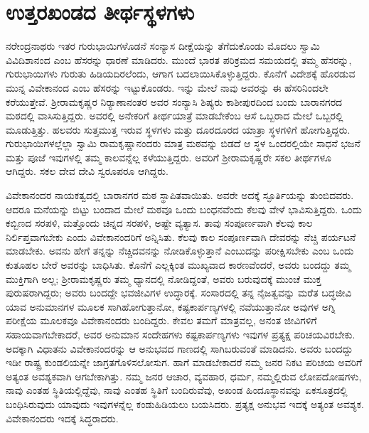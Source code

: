 
\chapter{ಉತ್ತರಖಂಡದ ತೀರ್ಥಸ್ಥಳಗಳು}

ನರೇಂದ್ರನಾಥರು ಇತರ ಗುರುಭಾಯಿಗಳೊಡನೆ ಸಂನ್ಯಾಸ ದೀಕ್ಷೆಯನ್ನು ತೆಗೆದುಕೊಂಡು ಮೊದಲು ಸ್ವಾಮಿ ವಿವಿದಿಶಾನಂದ ಎಂಬ ಹೆಸರನ್ನು ಧಾರಣೆ ಮಾಡಿದರು. ಮುಂದೆ ಭಾರತ ಪರಿಕ್ರಮದ ಸಮಯದಲ್ಲಿ ತಮ್ಮ ಹೆಸರನ್ನು, ಗುರುಭಾಯಿಗಳು ಗುರುತು ಹಿಡಿಯದಿರಲೆಂದು, ಆಗಾಗ ಬದಲಾಯಿಸಿಕೊಳ್ಳುತ್ತಿದ್ದರು. ಕೊನೆಗೆ ವಿದೇಶಕ್ಕೆ ಹೊರಡುವ ಮುನ್ನ ವಿವೇಕಾನಂದ ಎಂಬ ಹೆಸರನ್ನು ಇಟ್ಟುಕೊಂಡರು. ಇನ್ನು ಮೇಲೆ ನಾವು ಅವರನ್ನು ಈ ಹೆಸರಿನಿಂದಲೇ ಕರೆಯುತ್ತೇವೆ. ಶ‍್ರೀರಾಮಕೃಷ್ಣರ ನಿರ‍್ಯಾಣಾನಂತರ ಅವರ ಸಂನ್ಯಾಸಿ ಶಿಷ್ಯರು ಕಾಶೀಪುರದಿಂದ ಬಂದು ಬಾರಾನಗರದ ಮಠದಲ್ಲಿ ವಾಸಿಸುತ್ತಿದ್ದರು. ಅವರಲ್ಲಿ ಅನೇಕರಿಗೆ ತೀರ್ಥಯಾತ್ರೆ ಮಾಡಬೇಕೆಂಬ ಆಸೆ ಒಬ್ಬರಾದ ಮೇಲೆ ಒಬ್ಬರಲ್ಲಿ ಮೂಡುತ್ತಿತ್ತು. ಹಲವರು ಸುತ್ತಮುತ್ತ ಇರುವ ಸ್ಥಳಗಳು ಮತ್ತು ದೂರದೂರದ ಯಾತ್ರಾ ಸ್ಥಳಗಳಿಗೆ ಹೋಗುತ್ತಿದ್ದರು. ಗುರುಭಾಯಿಗಳಲ್ಲೆಲ್ಲಾ ಸ್ವಾಮಿ ರಾಮಕೃಷ್ಣಾನಂದರು ಮಾತ್ರ ಮಠವನ್ನು ಬಿಡದೆ ಆ ಸ್ಥಳ ಒಂದರಲ್ಲಿಯೇ ಸಾಧನೆ ಭಜನೆ ಮತ್ತು ಪೂಜೆ ಇವುಗಳಲ್ಲಿ ತಮ್ಮ ಕಾಲವನ್ನೆಲ್ಲ ಕಳೆಯುತ್ತಿದ್ದರು. ಅವರಿಗೆ ಶ‍್ರೀರಾಮಕೃಷ್ಣರೇ ಸಕಲ ತೀರ್ಥಗಳೂ ಆಗಿದ್ದರು. ಸಕಲ ದೇವ ದೇವಿ ಸ್ವರೂಪರೂ ಆಗಿದ್ದರು.

ವಿವೇಕಾನಂದರ ನಾಯಕತ್ವದಲ್ಲಿ ಬಾರಾನಗರ ಮಠ ಸ್ಥಾಪಿತವಾಯಿತು. ಅವರೇ ಅದಕ್ಕೆ ಸ್ಫೂರ್ತಿಯನ್ನು ತುಂಬಿದವರು. ಆದರೂ ಮನೆಯನ್ನು ಬಿಟ್ಟು ಬಂದಾದ ಮೇಲೆ ಮಠವೂ ಒಂದು ಬಂಧನವೆಂದು ಕೆಲವು ವೇಳೆ ಭಾವಿಸುತ್ತಿದ್ದರು. ಒಂದು ಕಬ್ಬಿಣದ ಸರಪಳಿ, ಮತ್ತೊಂದು ಚಿನ್ನದ ಸರಪಳಿ, ಅಷ್ಟೇ ವ್ಯತ್ಯಾಸ. ತಾವು ಸಂಪೂರ್ಣವಾಗಿ ಕೆಲವು ಕಾಲ ನಿರ್ಲಿಪ್ತವಾಗಬೇಕು ಎಂದು ವಿವೇಕಾನಂದರಿಗೆ ಅನ್ನಿಸಿತು. ಕೆಲವು ಕಾಲ ಸಂಪೂರ್ಣವಾಗಿ ದೇವರನ್ನು ನೆಚ್ಚಿ ಪರ್ಯಟನೆ ಮಾಡಬೇಕು. ಅವನು ಹೇಗೆ ತನ್ನನ್ನು ನೆಚ್ಚಿದವನನ್ನು ನೋಡಿಕೊಳ್ಳುತ್ತಾನೆ ಎಂಬುದನ್ನು ಪರೀಕ್ಷಿಸಬೇಕು ಎಂಬ ಒಂದು ಕುತೂಹಲ ಬೇರೆ ಅವರನ್ನು ಬಾಧಿಸಿತು. ಕೊನೆಗೆ ಎಲ್ಲಕ್ಕಿಂತ ಮುಖ್ಯವಾದ ಕಾರಣವೆಂದರೆ, ಅವರು ಬಂದದ್ದು ತಮ್ಮ ಮುಕ್ತಿಗಾಗಿ ಅಲ್ಲ; ಶ‍್ರೀರಾಮಕೃಷ್ಣರು ತಮ್ಮ ಧ್ಯಾನದಲ್ಲಿ ನೋಡಿದ್ದಂತೆ, ಅವರು ಬರುವುದಕ್ಕೆ ಮುಂಚೆ ಮುಕ್ತ ಪುರುಷರಾಗಿದ್ದರು; ಅವರು ಬಂದದ್ದೇ ಭವಜೀವಿಗಳ ಉದ್ಧಾರಕ್ಕೆ. ಸಂಸಾರದಲ್ಲಿ ತನ್ನ ನೈಜತ್ವವನ್ನು ಮರೆತ ಬದ್ಧಜೀವಿ ಯಾವ ಅನುಮಾನಗಳ ಮೂಲಕ ಸಾಗಿಹೋಗುತ್ತಾನೋ, ಕಷ್ಟಕಾರ್ಪಣ್ಯಗಳಲ್ಲಿ ನವೆಯುತ್ತಾನೋ ಅವುಗಳ ಅಗ್ನಿ ಪರೀಕ್ಷೆಯ ಮೂಲಕವೂ ವಿವೇಕಾನಂದರು ಬಂದಿದ್ದರು. ಕೇವಲ ತಮಗೆ ಮಾತ್ರವಲ್ಲ, ಅನಂತ ಜೀವಿಗಳಿಗೆ ಸಹಾಯವಾಗಬೇಕಾದರೆ, ಅವರ ಅನುಮಾನ ಸಂದೇಹಗಳು ಕಷ್ಟಕಾರ್ಪಣ್ಯಗಳು ಇವುಗಳ ಪ್ರತ್ಯಕ್ಷ ಪರಿಚಯವಿರಬೇಕು. ಅದಕ್ಕಾಗಿ ವಿಧಾತನು ವಿವೇಕಾನಂದರನ್ನು ಆ ಅನುಭವದ ಗಾಣದಲ್ಲಿ ಸಾಗಿಬರುವಂತೆ ಮಾಡಿದನು. ಅವರು ಬಂದದ್ದು ಇಡೀ ರಾಷ್ಟ್ರ ಕುಂಡಲಿಯನ್ನೇ ಜಾಗ್ರತಗೊಳಿಸಲೋಸುಗ. ಹಾಗೆ ಮಾಡಬೇಕಾದರೆ ನಮ್ಮ ಜನರ ನಿಕಟ ಪರಿಚಯ ಅವರಿಗೆ ಅತ್ಯಂತ ಅವಶ್ಯಕವಾಗಿ ಆಗಬೇಕಾಗಿತ್ತು. ನಮ್ಮ ಜನರ ಆಚಾರ, ವ್ಯವಹಾರ, ಧರ್ಮ, ನಮ್ಮಲ್ಲಿರುವ ಲೋಪದೋಷಗಳು, ನಾವು ಎಂತಹ ಸ್ಥಿತಿಯಲ್ಲಿದ್ದೆವು, ನಾವು ಎಂತಹ ಸ್ಥಿತಿಗೆ ಬಂದಿರುವೆವು, ಅಖಂಡ ಹಿಂದೂಸ್ಥಾನವನ್ನು ಏಕಸೂತ್ರದಲ್ಲಿ ಬಂಧಿಸಿರುವುದು ಯಾವುದು ಇವುಗಳನ್ನೆಲ್ಲ ಕಂಡುಹಿಡಿಯಲು ಬಯಸಿದರು. ಪ್ರತ್ಯಕ್ಷ ಅನುಭವ ಇದಕ್ಕೆ ಅತ್ಯಂತ ಅವಶ್ಯಕ. ವಿವೇಕಾನಂದರು ಇದಕ್ಕೆ ಸಿದ್ಧರಾದರು.

